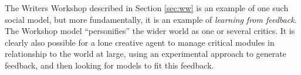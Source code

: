 The Writers Workshop described in Section \ref{sec:ww} is an example
of one such social model, but more fundamentally, it is an example of
\emph{learning from feedback}.  The Workshop model ``personifies'' the
wider world as one or several critics.  It is clearly also possible
for a lone creative agent to manage critical modules in relationship
to the world at large, using an experimental approach to generate
feedback, and then looking for models to fit this feedback.

